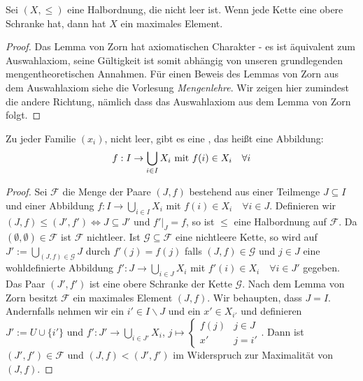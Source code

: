 \begin{theorem}
	Sei $(X,\le)$ eine Halbordnung, die nicht leer ist. Wenn jede Kette eine obere Schranke hat, dann hat $X$ ein maximales Element.
\end{theorem}
\begin{proof}
	Das Lemma von Zorn hat axiomatischen Charakter - es ist äquivalent zum Auswahlaxiom, seine Gültigkeit ist somit abhängig von unseren grundlegenden mengentheoretischen Annahmen. Für einen Beweis des Lemmas von Zorn aus dem Auswahlaxiom siehe die Vorlesung \textit{Mengenlehre}. Wir zeigen hier zumindest die andere Richtung, nämlich dass das Auswahlaxiom aus dem Lemma von Zorn folgt.
\end{proof}

\begin{conclusion}[Auswahlaxiom]
	Zu jeder Familie $(x_i)$, nicht leer, gibt es eine , das heißt eine Abbildung:
	\begin{align}
		f: I\to \bigcup_{i\in I} X_i\text{ mit } f(i)\in X_i\quad\forall i\notag
	\end{align}
\end{conclusion}
\begin{proof}
	Sei $\mathcal{F}$ die Menge der Paare $(J,f)$ bestehend aus einer Teilmenge $J\subseteq I$ und einer Abbildung $f:I\to \bigcup_{i\in I} X_i$ mit $f(i)\in X_i\quad\forall i\in J$. Definieren wir $(J,f)\le (J',f')\iff J\subseteq J'$ und $f'\vert_J = f$, so ist $\le$ eine Halbordnung auf $\mathcal{F}$. Da $(\emptyset,\emptyset)\in\mathcal{F}$ ist $\mathcal{F}$ nichtleer. Ist $\mathcal{G}\subseteq\mathcal{F}$ eine nichtleere Kette, so wird auf $J':=\bigcup_{(J,f)\in\mathcal{G}} J$ durch $f'(j)=f(j)$ falls $(J,f)\in\mathcal{G}$ und $j\in J$ eine wohldefinierte Abbildung $f':J\to \bigcup_{i\in J}X_i$ mit $f'(i)\in X_i\quad\forall i\in J'$ gegeben. Das Paar $(J',f')$ ist eine obere Schranke der Kette $\mathcal{G}$. Nach dem Lemma von Zorn besitzt $\mathcal{F}$ ein maximales Element $(J,f)$. Wir behaupten, dass $J=I$. Andernfalls nehmen wir ein $i'\in I\backslash J$ und ein $x'\in X_{i'}$ und definieren $J':= U\cup\{i'\}$ und $f':J'\to \bigcup_{i\in J'} X_i$, $j\mapsto\begin{cases}f(j)&j\in J\\ x'&j=i'\end{cases}$. Dann ist $(J',f')\in\mathcal{F}$ und $(J,f)<(J',f')$ im Widerspruch zur Maximalität von $(J,f)$.
\end{proof}


